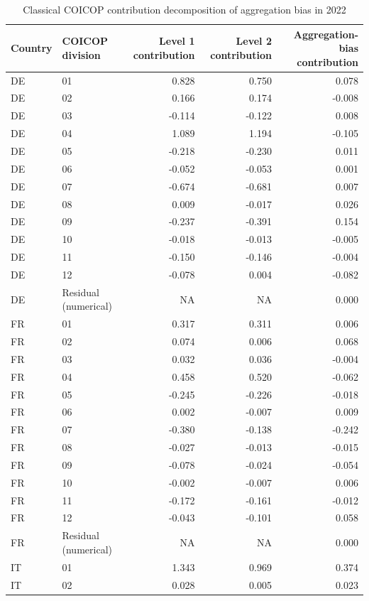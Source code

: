 
\begin{longtable}[t]{llrrr}
\caption{\label{tab:aggregation-bias-coicop-contributions-2022}Classical COICOP contribution decomposition of aggregation bias in 2022}\\
\toprule
Country & COICOP division & Level 1 contribution & Level 2 contribution & Aggregation-bias contribution\\
\midrule
DE & 01 & 0.828 & 0.750 & 0.078\\
DE & 02 & 0.166 & 0.174 & -0.008\\
DE & 03 & -0.114 & -0.122 & 0.008\\
DE & 04 & 1.089 & 1.194 & -0.105\\
DE & 05 & -0.218 & -0.230 & 0.011\\
\addlinespace
DE & 06 & -0.052 & -0.053 & 0.001\\
DE & 07 & -0.674 & -0.681 & 0.007\\
DE & 08 & 0.009 & -0.017 & 0.026\\
DE & 09 & -0.237 & -0.391 & 0.154\\
DE & 10 & -0.018 & -0.013 & -0.005\\
\addlinespace
DE & 11 & -0.150 & -0.146 & -0.004\\
DE & 12 & -0.078 & 0.004 & -0.082\\
DE & Residual (numerical) & NA & NA & 0.000\\
FR & 01 & 0.317 & 0.311 & 0.006\\
FR & 02 & 0.074 & 0.006 & 0.068\\
\addlinespace
FR & 03 & 0.032 & 0.036 & -0.004\\
FR & 04 & 0.458 & 0.520 & -0.062\\
FR & 05 & -0.245 & -0.226 & -0.018\\
FR & 06 & 0.002 & -0.007 & 0.009\\
FR & 07 & -0.380 & -0.138 & -0.242\\
\addlinespace
FR & 08 & -0.027 & -0.013 & -0.015\\
FR & 09 & -0.078 & -0.024 & -0.054\\
FR & 10 & -0.002 & -0.007 & 0.006\\
FR & 11 & -0.172 & -0.161 & -0.012\\
FR & 12 & -0.043 & -0.101 & 0.058\\
\addlinespace
FR & Residual (numerical) & NA & NA & 0.000\\
IT & 01 & 1.343 & 0.969 & 0.374\\
IT & 02 & 0.028 & 0.005 & 0.023\\

\end{longtable}

